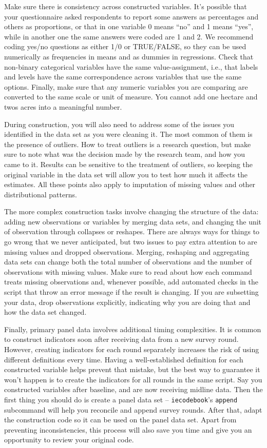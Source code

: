 Make sure there is consistency across constructed variables.
It's possible that your questionnaire asked respondents to report some answers as percentages and others as proportions,
or that in one variable 0 means ``no'' and 1 means ``yes'', 
while in another one the same answers were coded are 1 and 2.
We recommend coding yes/no questions as either 1/0 or TRUE/FALSE, 
so they can be used numerically as frequencies in means and as dummies in regressions.
Check that non-binary categorical variables have the same value-assignment, i.e., 
that labels and levels have the same correspondence across variables that use the same options.
Finally, make sure that any numeric variables you are comparing are converted to the same scale or unit of measure. 
You cannot add one hectare and twos acres into a meaningful number.

During construction, you will also need to address some of the issues 
you identified in the data set as you were cleaning it. 
The most common of them is the presence of outliers.
How to treat outliers is a research question, 
but make sure to note what was the decision made by the research team, 
and how you came to it. 
Results can be sensitive to the treatment of outliers, 
so keeping the original variable in the data set will allow you to test how much it affects the estimates.
All these points also apply to imputation of missing values and other distributional patterns.

The more complex construction tasks involve changing the structure of the data:
adding new observations or variables by merging data sets, 
and changing the unit of observation through collapses or reshapes.
There are always ways for things to go wrong that we never anticipated,
but two issues to pay extra attention to are missing values and dropped observations. 
Merging, reshaping and aggregating data sets can change both the total number of observations
and the number of observations with missing values.
Make sure to read about how each command treats missing observations and, 
whenever possible, add automated checks in the script that throw an error message if the result is changing.
If you are subsetting your data, 
drop observations explicitly, 
indicating why you are doing that and how the data set changed.

Finally, primary panel data involves additional timing complexities.
It is common to construct indicators soon after receiving data from a new survey round.
However, creating indicators for each round separately increases the risk of using different definitions every time.
Having a well-established definition for each constructed variable helps prevent that mistake,
but the best way to guarantee it won't happen is to create the indicators for all rounds in the same script.
Say you constructed variables after baseline, and are now receiving midline data.
Then the first thing you should do is create a panel data set
-- \texttt{iecodebook}'s \texttt{append} subcommand will help you reconcile and append survey rounds.
After that, adapt the construction code so it can be used on the panel data set.
Apart from preventing inconsistencies, 
this process will also save you time and give you an opportunity to review your original code.

